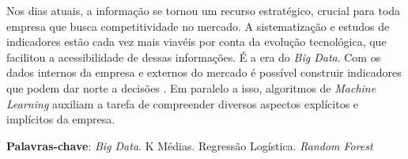 \begin{resumo}
 
 Nos dias atuais, a informação se tornou um recurso estratégico, crucial para toda empresa que busca competitividade no mercado. A sistematização e estudos de indicadores estão cada vez mais viavéis por conta da evolução tecnológica, que facilitou a acessibilidade de dessas informações. É a era do \emph{Big Data}. Com os dados internos da empresa e externos do mercado é possível construir indicadores que podem dar norte a decisões . Em paralelo a isso, algoritmos de \emph{Machine Learning} auxiliam a tarefa de compreender diversos aspectos explícitos e implícitos da empresa.

 \textbf{Palavras-chave}: \emph{Big Data}. K Médias. Regressão Logística. \emph{Random Forest} 
\end{resumo}